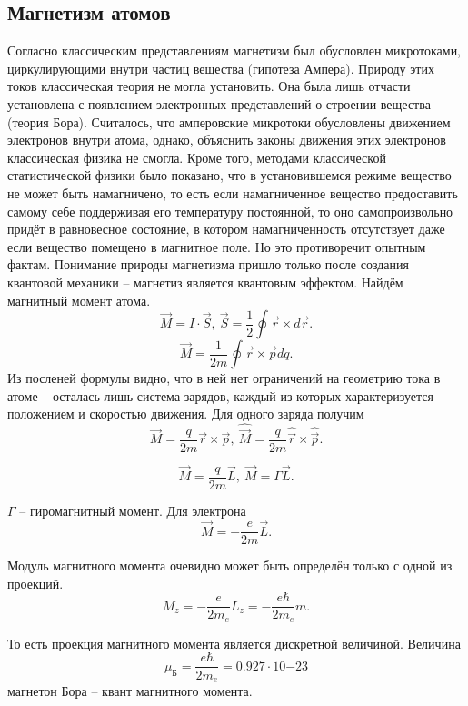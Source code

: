 \subsection{Магнетизм атомов}
Согласно классическим представлениям магнетизм был обусловлен микротоками, циркулирующими внутри частиц вещества (гипотеза Ампера). Природу этих токов классическая теория не могла установить. Она была лишь отчасти установлена с появлением электронных представлений о строении вещества (теория Бора). Считалось, что амперовские микротоки обусловлены движением электронов внутри атома, однако, объяснить законы движения этих электронов классическая физика не смогла. Кроме того, методами классической статистической физики было показано, что в установившемся режиме вещество не может быть намагничено, то есть если намагниченное вещество предоставить самому себе поддерживая его температуру постоянной, то оно самопроизвольно придёт в равновесное состояние, в котором намагниченность отсутствует даже если вещество помещено в магнитное поле. Но это противоречит опытным фактам.
Понимание природы магнетизма пришло только после создания квантовой механики -- магнетиз является квантовым эффектом. Найдём магнитный момент атома.
\[
    \vec{M} = I\cdot\vec{S},\ \vec{S} = \frac{1}{2}\oint\vec{r}\times d\vec{r}.
\]
\[
    \vec{M} = \frac{1}{2m}\oint \vec{r}\times\vec{p} dq.
\]
Из посленей формулы видно, что в ней нет ограничений на геометрию тока в атоме -- осталась лишь система зарядов, каждый из которых характеризуется положением и скоростью движения.
Для одного заряда получим
\[
    \vec{M} = \frac{q}{2m} \vec{r}\times\vec{p},\ \hat{\vec{M}} = \frac{q}{2m}
    \hat{\vec{r}}\times\hat{\vec{p}}.
\]

\[
    \vec{M} = \frac{q}{2m}\vec{L},\ \vec{M} = \Gamma\vec{L}.
\]

\( \Gamma \) -- гиромагнитный момент. Для электрона
\[
    \vec{M} = -\frac{e}{2m}\vec{L}.
\]

Модуль магнитного момента очевидно может быть определён только с одной из проекций.
\[
    M_z = -\frac{e}{2m_e}L_z = -\frac{e\hbar}{2m_e}m.
\]

То есть проекция магнитного момента является дискретной величиной. Величина
\[
    \mu_\text{Б} = \frac{e\hbar}{2m_e} = 0.927\cdot10{-23}
\]
магнетон Бора -- квант магнитного момента.

